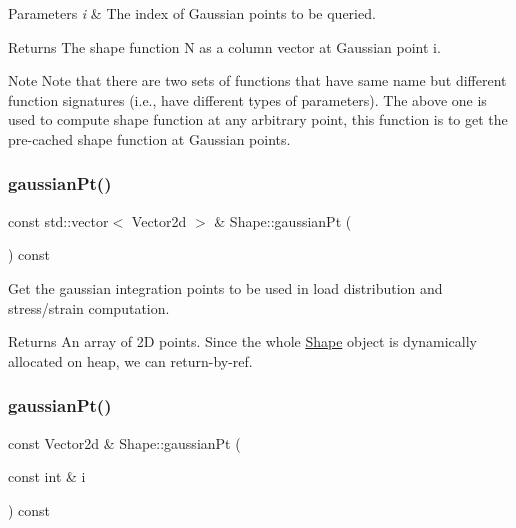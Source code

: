 \begin{DoxyParams}{Parameters}
{\em i} & The index of Gaussian points to be queried. \\
\hline
\end{DoxyParams}
\begin{DoxyReturn}{Returns}
The shape function N as a column vector at Gaussian point i.
\end{DoxyReturn}
\begin{DoxyNote}{Note}
Note that there are two sets of functions that have same name but different function signatures (i.\+e., have different types of parameters). The above one is used to compute shape function at any arbitrary point, this function is to get the pre-\/cached shape function at Gaussian points. 
\end{DoxyNote}
\mbox{\label{class_shape_a8d53e88ab51926dc57177c56c3fde714}} 
\subsubsection{\texorpdfstring{gaussian\+Pt()}{gaussianPt()}\hspace{0.1cm}{\footnotesize\ttfamily [1/2]}}
{\footnotesize\ttfamily const std\+::vector$<$ Vector2d $>$ \& Shape\+::gaussian\+Pt (\begin{DoxyParamCaption}{ }\end{DoxyParamCaption}) const}



Get the gaussian integration points to be used in load distribution and stress/strain computation. 

\begin{DoxyReturn}{Returns}
An array of 2D points. Since the whole \mbox{\hyperlink{class_shape}{Shape}} object is dynamically allocated on heap, we can return-\/by-\/ref. 
\end{DoxyReturn}
\mbox{\label{class_shape_a66cd2cc62229a4757a5d0eeeb36197de}} 
\subsubsection{\texorpdfstring{gaussian\+Pt()}{gaussianPt()}\hspace{0.1cm}{\footnotesize\ttfamily [2/2]}}
{\footnotesize\ttfamily const Vector2d \& Shape\+::gaussian\+Pt (\begin{DoxyParamCaption}\item[{const int \&}]{i }\end{DoxyParamCaption}) const}



